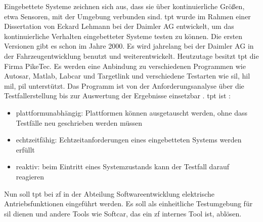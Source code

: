 Eingebettete Systeme zeichnen sich aus, dass sie über kontinuierliche Größen,
etwa Sensoren, mit der Umgebung verbunden sind. \ac{tpt} wurde im Rahmen einer Dissertation von Eckard Lehmann bei der Daimler AG entwickelt, 
um das kontinuierliche Verhalten eingebetteter Systeme testen zu können. Die ersten Versionen gibt es schon im Jahre 2000.
Es wird jahrelang bei der Daimler AG in der Fahrzeugentwicklung benutzt und weiterentwickelt. Heutzutage besitzt \ac{tpt} die Firma PikeTec. 
Es werden eine Anbindung zu verschiedenen Programmen wie Autosar, Matlab, Labcar und Targetlink und verschiedene Testarten wie \ac{sil}, \ac{hil} \ac{mil},
\ac{pil} unterstützt. Das Programm ist von der Anforderungsanalyse über die Testfallerstellung bis zur Auswertung der Ergebnisse einsetzbar \cite[vgl.][]{piketecwebseite}\cite[vgl.][]{tptwikipedia}.
\ac{tpt} ist \cite[vgl.][S. 120]{tpt}:
\begin{itemize}
\item plattformunabhängig: Plattformen können ausgetauscht werden, ohne dass Testfälle neu geschrieben werden müssen
\item echtzeitfähig: Echtzeitanforderungen eines eingebetteten Systems werden erfüllt
\item reaktiv: beim Eintritt eines Systemzustands kann der Testfall darauf reagieren
\end{itemize}
Nun soll \ac{tpt} bei \ac{zf} in der Abteilung Softwareentwicklung elektrische Antriebsfunktionen eingeführt werden.
Es soll als einheitliche Testumgebung für \ac{sil} dienen und andere Tools wie Softcar, das ein \ac{zf} internes Tool ist, ablösen.







